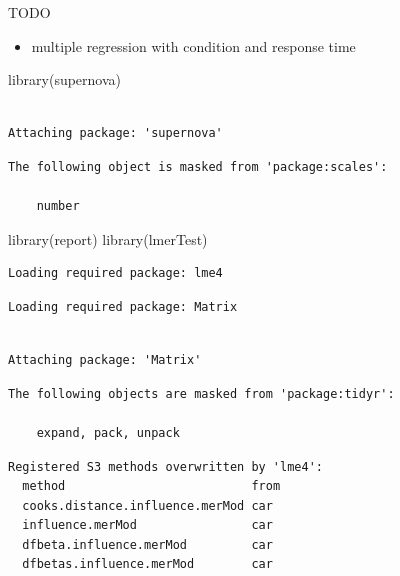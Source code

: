 \documentclass[
  letterpaper,
  DIV=11,
  numbers=noendperiod]{scrreprt}
\newenvironment{Shaded}{\begin{snugshade}}{\end{snugshade}}
\newcommand{\FunctionTok}[1]{\textcolor[rgb]{0.28,0.35,0.67}{#1}}
\newcommand{\NormalTok}[1]{\textcolor[rgb]{0.00,0.23,0.31}{#1}}
\providecommand{\tightlist}{%
  \setlength{\itemsep}{0pt}\setlength{\parskip}{0pt}}\usepackage{longtable,booktabs,array}
\begin{document}
TODO

\begin{itemize}
\tightlist
\item
  multiple regression with condition and response time
\end{itemize}

\begin{Shaded}
\begin{Highlighting}[]
\FunctionTok{library}\NormalTok{(supernova)}
\end{Highlighting}
\end{Shaded}

\begin{verbatim}

Attaching package: 'supernova'
\end{verbatim}

\begin{verbatim}
The following object is masked from 'package:scales':

    number
\end{verbatim}

\begin{Shaded}
\begin{Highlighting}[]
\FunctionTok{library}\NormalTok{(report)}
\FunctionTok{library}\NormalTok{(lmerTest)}
\end{Highlighting}
\end{Shaded}

\begin{verbatim}
Loading required package: lme4
\end{verbatim}

\begin{verbatim}
Loading required package: Matrix
\end{verbatim}

\begin{verbatim}

Attaching package: 'Matrix'
\end{verbatim}

\begin{verbatim}
The following objects are masked from 'package:tidyr':

    expand, pack, unpack
\end{verbatim}

\begin{verbatim}
Registered S3 methods overwritten by 'lme4':
  method                          from
  cooks.distance.influence.merMod car 
  influence.merMod                car 
  dfbeta.influence.merMod         car 
  dfbetas.influence.merMod        car 
\end{verbatim}
\end{document}
